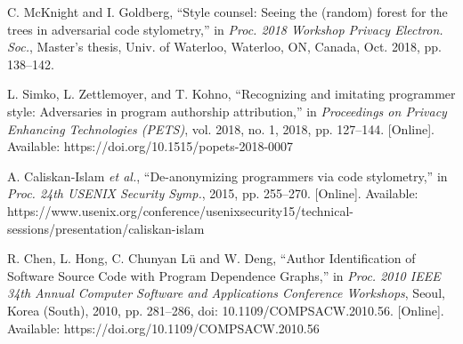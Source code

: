 \documentclass[conference]{IEEEtran}
\begin{document}
\begin{thebibliography}{00}
    C. McKnight and I. Goldberg, ``Style counsel: Seeing the (random) forest for the trees in adversarial code stylometry,'' in \textit{Proc. 2018 Workshop Privacy Electron. Soc.}, Master's thesis, Univ. of Waterloo, Waterloo, ON, Canada, Oct. 2018, pp. 138--142.

    L. Simko, L. Zettlemoyer, and T. Kohno, ``Recognizing and imitating programmer style: Adversaries in program authorship attribution,'' in \textit{Proceedings on Privacy Enhancing Technologies (PETS)}, vol. 2018, no. 1, 2018, pp. 127--144. [Online]. Available: https://doi.org/10.1515/popets-2018-0007

    A. Caliskan-Islam \textit{et al.}, ``De-anonymizing programmers via code stylometry,'' in \textit{Proc. 24th USENIX Security Symp.}, 2015, pp. 255--270. [Online]. Available: https://www.usenix.org/conference/usenixsecurity15/technical-sessions/presentation/caliskan-islam

    R. Chen, L. Hong, C. Chunyan Lü and W. Deng, ``Author Identification of Software Source Code with Program Dependence Graphs,'' in \textit{Proc. 2010 IEEE 34th Annual Computer Software and Applications Conference Workshops}, Seoul, Korea (South), 2010, pp. 281--286, doi: 10.1109/COMPSACW.2010.56. [Online]. Available: https://doi.org/10.1109/COMPSACW.2010.56


\end{thebibliography}
    
\end{document}
